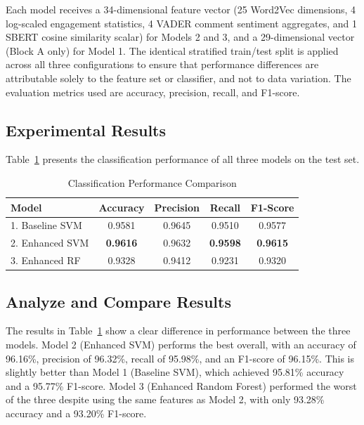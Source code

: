 \documentclass[conference]{IEEEtran}
\begin{document}
Each model receives a 34-dimensional feature vector (25 Word2Vec dimensions, 4 log-scaled engagement statistics, 4 VADER comment sentiment aggregates, and 1 SBERT cosine similarity scalar) for Models 2 and 3, and a 29-dimensional vector (Block A only) for Model 1. The identical stratified train/test split is applied across all three configurations to ensure that performance differences are attributable solely to the feature set or classifier, and not to data variation. The evaluation metrics used are accuracy, precision, recall, and F1-score.

\subsection{Experimental Results}
 
Table~\ref{tab:results} presents the classification performance of all
three models on the test set.
 
\begin{table}[htbp]
\caption{Classification Performance Comparison}
\label{tab:results}
\centering
\begin{tabular}{|l|c|c|c|c|}
\hline
\textbf{Model} & \textbf{Accuracy} & \textbf{Precision} & \textbf{Recall} & \textbf{F1-Score} \\
\hline
1. Baseline SVM   & 0.9581 & 0.9645 & 0.9510 & 0.9577 \\
2. Enhanced SVM   & \textbf{0.9616} & 0.9632 & \textbf{0.9598} & \textbf{0.9615} \\
3. Enhanced RF     & 0.9328 & 0.9412 & 0.9231 & 0.9320 \\
\hline
\end{tabular}
\end{table}










\subsection{Analyze and Compare Results}

The results in Table~\ref{tab:results} show a clear difference in performance between the three models. Model 2 (Enhanced SVM) performs the best overall, with an accuracy of 96.16\%, precision of 96.32\%, recall of 95.98\%, and an F1-score of 96.15\%. This is slightly better than Model 1 (Baseline SVM), which achieved 95.81\% accuracy and a 95.77\% F1-score. Model 3 (Enhanced Random Forest) performed the worst of the three despite using the same features as Model 2, with only 93.28\% accuracy and a 93.20\% F1-score.
\end{document}
